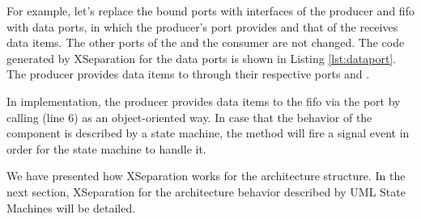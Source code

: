 For example, let's replace the bound ports with interfaces of the producer and fifo with data ports, in which the producer's port provides and that of the  receives data items.
The other ports of the  and the consumer are not changed.
The code generated by XSeparation for the data ports is shown in Listing \ref{lst:dataport}.
The  producer provides data items to  through their respective ports  and .

\begin{minipage}{\columnwidth}
	
\end{minipage} 

In implementation, the producer provides data items to the fifo via the port  by calling  (line 6) as an object-oriented way.
In case that the behavior of the component is described by a state machine, the  method will fire a signal event in order for the state machine to handle it.







We have presented how XSeparation works for the architecture structure.
In the next section, XSeparation for the architecture behavior described by UML State Machines will be detailed.
